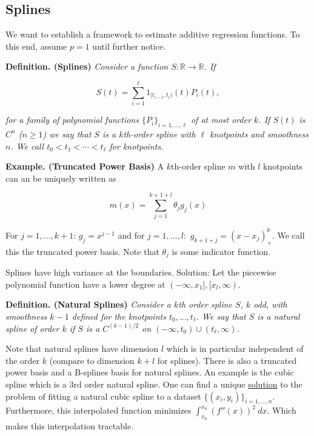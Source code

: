 \documentclass[a4paper,10pt,openany]{book}
\begin{document}
\hypertarget{splines}{%
\subsection{Splines}\label{splines}}

We want to establish a framework to estimate additive regression functions. To this end, assume \(p=1\) until further notice.

\textbf{Definition. (Splines)} \emph{Consider a function \(S : \mathbb R\to \mathbb R\). If}

\[
S(t)=\sum_{i=1}^\ell 1_{[t_{i-1},t_i)}(t)P_i(t),
\]

\emph{for a family of polynomial functions \(\{P_i\}_{i=1,...,\ell}\) of at most order \(k\). If \(S(t)\) is \(C^n\) (\(n\ge 1\)) we say that \(S\) is a \(k\)th-order spline with \(\ell\) knotpoints and smoothness \(n\). We call \(t_0<t_1<\cdots <t_\ell\) for knotpoints.}

\textbf{Example. (Truncated Power Basis)} A \(k\)th-order spline \(m\) with \(l\) knotpoints can an be uniquely written as

\[
m(x)=\sum_{j=1}^{k+1+l}\theta_jg_j(x)
\]

For \(j=1,\dots, k+1\): \(g_{j}=x^{j-1}\) and for \(j=1,\dots,l:\) \(g_{k+1+j}=(x-x_j)^k_+\). We call this the truncated power basis. Note that \(\theta_j\) is some indicator function.

Splines have high variance at the boundaries. Solution: Let the piecewise polynomial function have a lower degree at \((-\infty,x_1],[x_l,\infty)\).

\textbf{Definition. (Natural Splines)} \emph{Consider a \(k\)th order spline \(S\), \(k\) odd, with smoothness \(k-1\) defined for the knotpoints \(t_0,...,t_\ell\). We say that \(S\) is a natural spline of order \(k\) if \(S\) is a \(C^{(k-1)/2}\) on \((-\infty,t_0)\cup (t_\ell,\infty)\).}

Note that natural splines have dimension \(l\) which is in particular independent of the order \(k\) (compare to dimension \(k+l\) for splines). There is also a truncated power basis and a B-splines basis for natural splines. An example is the cubic spline which is a 3rd order natural spline. One can find a unique \href{https://random-walks.org/content/misc/ncs/ncs.html}{solution} to the problem of fitting a natural cubic spline to a dataset \(\{(x_i,y_i)\}_{i=1,...,n}\). Furthermore, this interpolated function minimizes \(\int_{x_0}^{x_n} (f''(x))^2\ dx\). Which makes this interpolation tractable.
\end{document}
